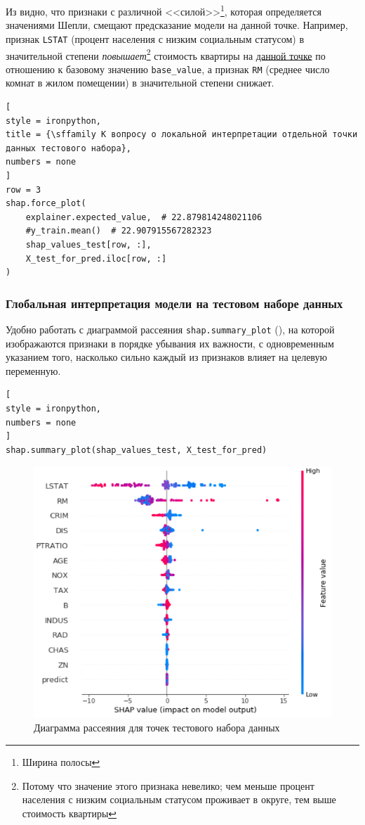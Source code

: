 \documentclass[%
	11pt,
	a4paper,
	utf8,
		]{article}
\begin{document}
Из  видно, что признаки с различной <<силой>>\footnote{Ширина полосы}, которая определяется значениями Шепли, смещают предсказание модели на данной точке. Например, признак \texttt{LSTAT} (процент населения с низким социальным статусом) в значительной степени \emph{повышает}\footnote{Потому что значение этого признака невелико; чем меньше процент населения с низким социальным статусом проживает в округе, тем выше стоимость квартиры} стоимость квартиры на \underline{данной точке} по отношению к базовому значению \texttt{base\_value}, а признак \texttt{RM} (среднее число комнат в жилом помещении) в значительной степени снижает.

\begin{lstlisting}[
style = ironpython,
title = {\sffamily К вопросу о локальной интерпретации отдельной точки данных тестового набора},
numbers = none
]
row = 3
shap.force_plot(
    explainer.expected_value,  # 22.879814248021106
    #y_train.mean()  # 22.907915567282323
    shap_values_test[row, :],
    X_test_for_pred.iloc[row, :]
)
\end{lstlisting}

\subsubsection{Глобальная интерпретация модели на тестовом наборе данных}

Удобно работать с диаграммой рассеяния \texttt{shap.summary\_plot} (), на которой изображаются признаки в порядке убывания их важности, с одновременным указанием того, насколько сильно каждый из признаков влияет на целевую переменную.

\begin{lstlisting}[
style = ironpython,
numbers = none
]
shap.summary_plot(shap_values_test, X_test_for_pred)
\end{lstlisting}

\begin{figure}[h]
	\centering
	\includegraphics[scale=0.85]{figures/summary_plt_test.png}
	\caption{ Диаграмма рассеяния для точек тестового набора данных }\label{fig:summary_plt_test}
\end{figure}
\end{document}
